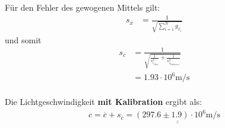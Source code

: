 F\"ur den Fehler des gewogenen Mittels gilt:
\begin{align*}
    s_{\overline{x}} &= \frac{1}{\sqrt{\sum_{i=1}^{N} g_{\overline{x}_i}}}
\end{align*}
und somit
\begin{align*}
    s_{\overline{c}} &= \frac{1}{ \sqrt{\frac{1}{s_{\overline{c_{Alex}}}^2} + \frac{1}{s_{\overline{c_{Yohannes}}}^2}}} \\
                     &= 1.93 \cdot 10^6 \textrm{m}/\textrm{s} \\
\end{align*}

Die Lichtgeschwindigkeit \textbf{mit Kalibration} ergibt als:
\begin{align*}
    c = \overline{c} + s_{\overline{c}} = \underline{\underline{(297.6 \pm 1.9) \cdot 10^6 \textrm{m}/\textrm{s}}}
\end{align*}


